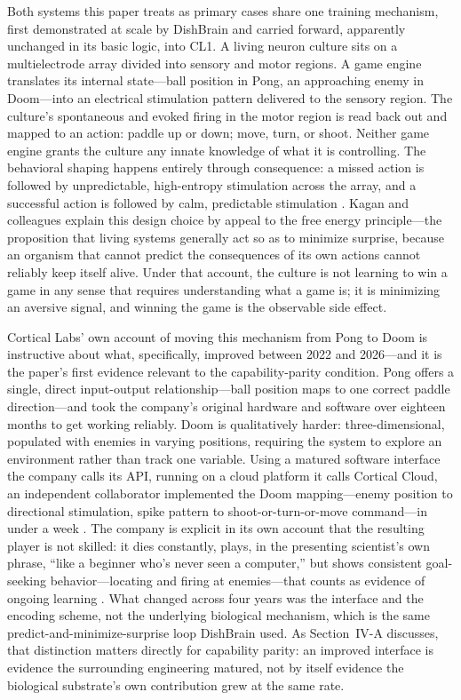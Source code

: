 \documentclass[journal]{IEEEtran}
\begin{document}
Both systems this paper treats as primary cases share one training mechanism,
first demonstrated at scale by DishBrain and carried forward, apparently unchanged
in its basic logic, into CL1. A living neuron culture sits on a multielectrode
array divided into sensory and motor regions. A game engine translates its internal
state---ball position in Pong, an approaching enemy in Doom---into an electrical
stimulation pattern delivered to the sensory region. The culture's spontaneous and
evoked firing in the motor region is read back out and mapped to an action: paddle up
or down; move, turn, or shoot. Neither game engine grants the culture any innate
knowledge of what it is controlling. The behavioral shaping happens entirely through
consequence: a missed action is followed by unpredictable, high-entropy stimulation
across the array, and a successful action is followed by calm, predictable
stimulation \cite{kagan2022dishbrain}. Kagan and colleagues explain this design
choice by appeal to the free energy principle---the proposition that living systems
generally act so as to minimize surprise, because an organism that cannot predict the
consequences of its own actions cannot reliably keep itself alive. Under that
account, the culture is not learning to win a game in any sense that requires
understanding what a game is; it is minimizing an aversive signal, and winning the
game is the observable side effect.

Cortical Labs' own account of moving this mechanism from Pong to Doom is instructive
about what, specifically, improved between 2022 and 2026---and it is the paper's
first evidence relevant to the capability-parity condition. Pong offers a single,
direct input-output relationship---ball position maps to one correct paddle
direction---and took the company's original hardware and software over eighteen
months to get working reliably. Doom is qualitatively harder: three-dimensional,
populated with enemies in varying positions, requiring the system to explore an
environment rather than track one variable. Using a matured software interface the
company calls its API, running on a cloud platform it calls Cortical Cloud, an
independent collaborator implemented the Doom mapping---enemy position to
directional stimulation, spike pattern to shoot-or-turn-or-move command---in under a
week \cite{corticallabs2026doom}. The company is explicit in its own account that the
resulting player is not skilled: it dies constantly, plays, in the presenting
scientist's own phrase, ``like a beginner who's never seen a computer,'' but shows
consistent goal-seeking behavior---locating and firing at enemies---that counts as
evidence of ongoing learning \cite{corticallabs2026doom}. What changed across four
years was the interface and the encoding scheme, not the underlying biological
mechanism, which is the same predict-and-minimize-surprise loop DishBrain used. As
Section~IV-A discusses, that distinction matters directly for capability parity: an
improved interface is evidence the surrounding engineering matured, not by itself
evidence the biological substrate's own contribution grew at the same rate.
\end{document}
